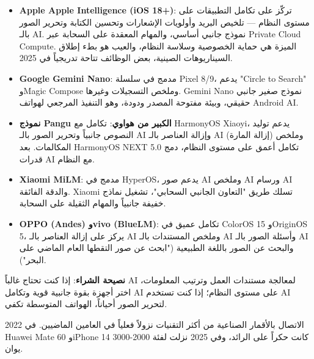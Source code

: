 \begin{itemize}
  \item \textbf{Apple Apple Intelligence (iOS 18+)}: تركّز على تكامل التطبيقات على مستوى النظام — تلخيص البريد وأولويات الإشعارات وتحسين الكتابة وتحرير الصور بالـ AI. نموذج جانبي أساسي، والمهام المعقدة على السحابة عبر Private Cloud Compute. الميزة هي حماية الخصوصية وسلاسة النظام، والعيب هو بطء إطلاق السيناريوهات الصينية، بعض الوظائف تتاحة تدريجياً في 2025.
  \item \textbf{Google Gemini Nano}: مدمج في سلسلة Pixel 8/9، يدعم "Circle to Search" وMagic Compose وملخص التسجيلات وغيرها. Gemini Nano نموذج صغير جانبي حقيقي، وبيئة مفتوحة المصدر ودودة، وهو التنفيذ المرجعي لهواتف Android AI.
  \item \textbf{نموذج Pangu الكبير من هواوي}: تكامل مع HarmonyOS Xiaoyi، يدعم توليد النصوص جانبياً وتحرير الصور بالـ AI وإزالة العناصر بالـ AI (إزالة المارة) وملخص المكالمات. بعد HarmonyOS NEXT 5.0 تكامل أعمق على مستوى النظام، دمج قدرات AI مع النظام.
  \item \textbf{Xiaomi MiLM}: مدمج في HyperOS، يدعم صور AI وملخص AI ورسام AI والدقة الفائقة. Xiaomi تسلك طريق "التعاون الجانبي السحابي"، تشغيل نماذج خفيفة جانبياً والمهام الثقيلة على السحابة.
  \item \textbf{OPPO (Andes) وvivo (BlueLM)}: تكامل عميق في ColorOS 15 وOriginOS 5، يركز على إزالة العناصر بالـ AI وملخص المستندات بالـ AI وأسئلة الصور بالـ AI والبحث عن الصور باللغة الطبيعية ("ابحث عن صور التقطها العام الماضي على البحر").
\end{itemize}

\textbf{نصيحة الشراء}: إذا كنت تحتاج غالباً AI لمعالجة مستندات العمل وترتيب المعلومات، اختر أجهزة بقوة جانبية قوية وتكامل AI على مستوى النظام؛ إذا كنت تستخدم AI لتحرير الصور أحياناً، الهواتف المتوسطة تكفي.


الاتصال بالأقمار الصناعية من أكثر التقنيات نزولاً فعلياً في العامين الماضيين. في 2022 Huawei Mate 60 وiPhone 14 كانت حكراً على الرائد، وفي 2025 نزلت لفئة 2000-3000 يوان.

